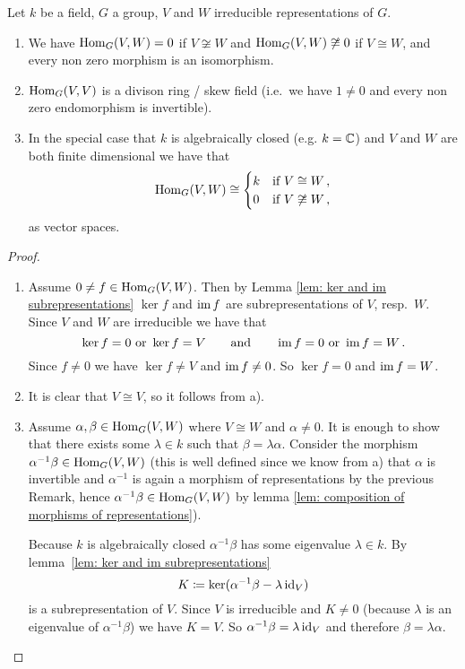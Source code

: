 \begin{lem}
  Let $k$ be a field, $G$ a group, $V$ and $W$ irreducible representations of $G$.
  \begin{enumerate}[label=\emph{\alph*)},leftmargin=*]
    \item
      We have $\operatorname{Hom}_G(V,W) = 0$ if $V \not\cong W$ and $\operatorname{Hom}_G(V,W) \not\cong 0$ if $V \cong W$, and every non zero morphism is an isomorphism.
    \item
      $\operatorname{Hom}_G(V,V)$ is a divison ring / skew field (i.e.\ we have $1 \neq 0$ and every non zero endomorphism is invertible).
    \item
      In the special case that $k$ is algebraically closed (e.g. $k = \mathbb{C}$) and $V$ and $W$ are both finite dimensional we have that
      \[
              \operatorname{Hom}_G(V,W)
        \cong \begin{cases}
                k & \text{if } V \cong     W \,,  \\
                0 & \text{if } V \not\cong W \,,
              \end{cases}
      \]
      as vector spaces.
  \end{enumerate}
\end{lem}
\begin{proof}
  \begin{enumerate}[label=\emph{\alph*)},leftmargin=*]
    \item 
      Assume $0 \neq f \in \operatorname{Hom}_G(V,W)$.
      Then by Lemma \ref{lem: ker and im subrepresentations} $\ker f$ and $\operatorname{im} f$ are subrepresentations of $V$, resp.\ $W$.
      Since $V$ and $W$ are irreducible we have that
      \[
          \ker f = 0
          \text{ or }
          \ker f = V
        \qquad
        \text{and}
        \qquad
          \operatorname{im} f = 0
          \text{ or }
          \operatorname{im} f = W \,.
      \]
      Since $f \neq 0$ we have $\ker f \neq V$ and $\operatorname{im} f \neq 0$.
      So $\ker f = 0$ and $\operatorname{im} f = W$.
    \item
      It is clear that $V \cong V$, so it follows from a).
    \item
      Assume $\alpha, \beta \in \operatorname{Hom}_G(V,W)$ where $V \cong W$ and $\alpha \neq 0$.
      It is enough to show that there exists some $\lambda \in k$ such that $\beta = \lambda \alpha$.
      Consider the morphism $\alpha^{-1} \beta \in \operatorname{Hom}_G(V,W)$ (this is well defined since we know from a) that $\alpha$ is invertible and $\alpha^{-1}$ is again a morphism of representations by the previous Remark, hence $\alpha^{-1} \beta \in \operatorname{Hom}_G(V,W)$ by lemma \ref{lem: composition of morphisms of representations}).
      
      Because $k$ is algebraically closed $\alpha^{-1} \beta$ has some eigenvalue $\lambda \in k$.
      By \mbox{lemma \ref{lem: ker and im subrepresentations}}
      \[
                  K
        \coloneqq \ker(\alpha^{-1} \beta - \lambda \operatorname{id}_V)
      \]
      is a subrepresentation of $V$.
      Since $V$ is irreducible and $K \neq 0$ (because $\lambda$ is an eigenvalue of $\alpha^{-1} \beta$) we have $K = V$.
      So $\alpha^{-1} \beta = \lambda \operatorname{id}_V$ and therefore $\beta = \lambda \alpha$.
    \qedhere
  \end{enumerate}
\end{proof}


